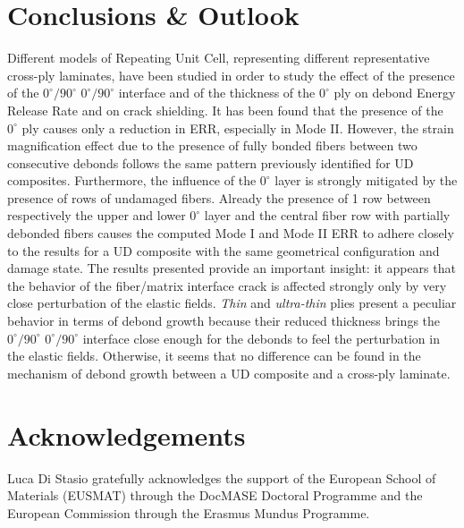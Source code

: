 \documentclass[review]{elsarticle}
\begin{document}

\section{Conclusions \& Outlook}

Different models of Repeating Unit Cell, representing different representative cross-ply laminates, have been studied in order to study the effect of the presence of the $0^{\circ}/90^{\circ}$ $0^{\circ}/90^{\circ}$ interface and of the thickness of the $0^{\circ}$ ply on debond Energy Release Rate and on crack shielding. It has been found that the presence of the $0^{\circ}$ ply causes only a reduction in ERR, especially in Mode II. However, the strain magnification effect due to the presence of fully bonded fibers between two consecutive debonds follows the same pattern previously identified for UD composites. Furthermore, the influence of the $0^{\circ}$ layer is strongly mitigated by the presence of rows of undamaged fibers. Already the presence of 1 row between respectively the upper and lower $0^{\circ}$ layer and the central fiber row with partially debonded fibers causes the computed Mode I and Mode II ERR to adhere closely to the results for a UD composite with the same geometrical configuration and damage state. The results presented provide an important insight: it appears that the behavior of the fiber/matrix interface crack is affected strongly only by very close perturbation of the elastic fields. \emph{Thin} and \emph{ultra-thin} plies present a peculiar behavior in terms of debond growth because their reduced thickness brings the $0^{\circ}/90^{\circ}$ $0^{\circ}/90^{\circ}$ interface close enough for the debonds to feel the perturbation in the elastic fields. Otherwise, it seems that no difference can be found in the mechanism of debond growth between a UD composite and a cross-ply laminate.


\section*{Acknowledgements}

Luca Di Stasio gratefully acknowledges the support of the European School of Materials (EUSMAT) through the DocMASE Doctoral Programme and the European Commission through the Erasmus Mundus Programme.



\end{document}
